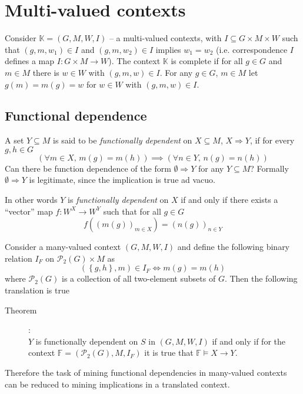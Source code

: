 \documentclass[a4paper]{article}
\newcommand{\obj}[1]{{\left\{ #1 \right \}}}
\newcommand{\brac}[1]{{\left ( #1 \right )}}
\newcommand{\Pwr}{\mathcal{P}}
\newcommand{\Ctx}{\mathbb{K}}
\begin{document}



\section{Multi-valued contexts} %
\label{sec:multi_valued_contexts}

Consider $\Ctx=\brac{G,M,W,I}$ -- a multi-valued contexts, with $I\subseteq G\times M\times W$ such that $(g,m,w_1)\in I$ and $(g,m,w_2)\in I$ implies $w_1=w_2$ (i.e. correspondence $I$ defines a map $I:G\times M\to W$). The context $\Ctx$ is complete if for all $g\in G$ and $m\in M$ there is $w\in W$ with $(g,m,w)\in I$. For any $g\in G$, $m\in M$ let $g(m)=m(g)=w$ for $w\in W$ with $(g,m,w)\in I$.


\subsection{Functional dependence} %
\label{sub:functional_dependence}
A set $Y\subseteq M$ is said to be \emph{functionally dependent} on $X\subseteq M$, $X\Rightarrow Y$, if for every $g,h\in G$ \[ \brac{ \forall m\in X,\,m(g)=m(h) } \implies \brac{ \forall n\in Y,\,n(g)=n(h) } \]
Can there be function dependence of the form $\emptyset \Rightarrow Y$ for any $Y\subseteq M$? Formally $\emptyset \Rightarrow Y$ is legitimate, since the implication is true ad vacuo.

In other words $Y$ is \emph{functionally dependent} on $X$ if and only if there exists a ``vector'' map $f: W^X\to W^Y$ such that for all $g\in G$ \[f\brac{\brac{m(g)}_{m\in X}} = \brac{n(g)}_{n\in Y}\] 

Consider a many-valued context $\brac{G,M,W,I}$ and define the following binary relation $I_F$ on $\Pwr_2{(G)}\times M$ as \[\brac{\obj{g,h},m}\in I_F \Leftrightarrow m(g)=m(h)\] where $\Pwr_2{(G)}$ is a collection of all two-element subsets of $G$. Then the following translation is true \begin{description}
	\item[Theorem]:\hfill \\
	$Y$ is functionally dependent on $S$ in $\brac{G,M,W,I}$ if and only if for the context $\mathbb{F} = \brac{\Pwr_2{(G)}, M, I_F}$ it is true that $\mathbb{F}\models X\to Y$.
\end{description}
Therefore the task of mining functional dependencies in many-valued contexts can be reduced to mining implications in a translated context.
\end{document}
